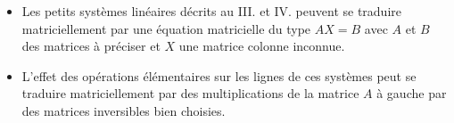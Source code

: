 \begin{rem}
	\begin{itemize}
		\item Les petits systèmes linéaires décrits au III. et IV. peuvent se traduire matriciellement par une équation matricielle du type \(AX = B\) avec \(A\) et \(B\) des matrices à préciser et \(X\) une matrice colonne inconnue.
		\item L’effet des opérations élémentaires sur les lignes de ces systèmes peut se traduire matriciellement par des multiplications de la matrice \(A\) à gauche par des matrices inversibles bien choisies.
	\end{itemize}
\end{rem}


